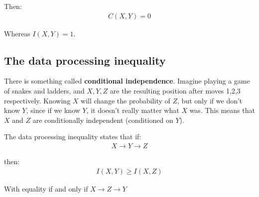 \documentclass[11pt,a4paper,titlepage,dvipsnames,cmyk]{scrartcl}
\begin{document}
Then:
\begin{align*}
C(X,Y) = 0
\end{align*}

Whereas $I(X,Y) = 1$.

\subsection{The data processing inequality}
There is something called \textbf{conditional independence}. Imagine playing a game of snakes and ladders, and $X,Y,Z$ are the resulting position after moves 1,2,3 respectively. Knowing $X$ will change the probability of $Z$, but only if we don't know $Y$, since if we know $Y$, it doesn't really matter what $X$ was. This means that $X$ and $Z$ are conditionally independent (conditioned on $Y$).

The data processing inequality states that if:
\begin{align*}
X \rightarrow Y \rightarrow Z
\end{align*}

then:
\begin{align*}
I(X,Y) \ge I(X,Z)
\end{align*}

With equality if and only if $X \rightarrow Z \rightarrow Y$
\end{document}
